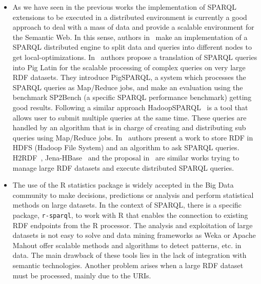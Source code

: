 \begin{itemize}
\item As we have seen in the previous works the implementation of SPARQL 
extensions to be executed in a distributed environment is currently a good 
approach to deal with a mass of data and provide a scalable environment for the 
Semantic Web. In this sense, authors in~\cite{DBLP:journals/pvldb/HuangAR11} make an implementation of a SPARQL 
distributed engine to split data and queries into different nodes to get 
local-optimizations. In~\cite{Schatzle:2011:PMS:1999299.1999303} authors propose a translation of SPARQL queries 
into Pig Latin for the scalable processing of complex queries on very large RDF 
datasets. They introduce PigSPARQL, a system which processes the SPARQL queries 
as Map/Reduce jobs, and make an evaluation using the benchmark SP2Bench (a 
specific SPARQL performance benchmark) getting good results. Following a similar 
approach HadoopSPARQL~\cite{liuhadoopsparql} is a tool that allows user to submit multiple queries 
at the same time. These queries are handled by an algorithm that is in charge of 
creating and distributing sub queries using Map/Reduce jobs. In~\cite{FarhanHusain:2009:SRL:1695659.1695734} authors 
present a work to store RDF in HDFS (Hadoop File System) and an algorithm to ask 
SPARQL queries. H2RDF~\cite{Papailiou:2012:HAQ:2187980.2188058}, Jena-HBase~\cite{DBLP:conf/semweb/KhadilkarKTC12} and the proposal in~\cite{maindonald2007data} 
are similar works trying to manage large RDF datasets and execute distributed SPARQL queries. 

\item The use of the R statistics package is widely accepted in the Big 
Data community to make decisions, predictions or analysis and perform statistical methods on large datasets. In 
the context of SPARQL, there is a specific package, \texttt{r-sparql}, to work with R that enables the 
connection to existing RDF endpoints from the R processor. The analysis and exploitation of large datasets is not easy to solve and data 
mining frameworks as Weka or Apache Mahout offer scalable methods and algorithms 
to detect patterns, etc. in data. The main drawback of these tools lies in the 
lack of integration with semantic technologies. Another problem arises when a 
large RDF dataset must be processed, mainly due to the URIs. 



\end{itemize}
